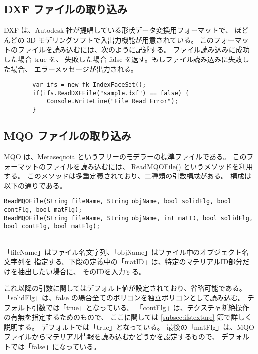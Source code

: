 \subsection{DXF ファイルの取り込み}
DXF は、Autodesk 社が提唱している形状データ変換用フォーマットで、
ほどんどの 3D モデリングソフトで入出力機能が用意されている。
このフォーマットのファイルを読み込むには、次のように記述する。
ファイル読み込みに成功した場合 true を、
失敗した場合 false を返す。もしファイル読み込みに失敗した場合、
エラーメッセージが出力される。
\\
\begin{screen}
\begin{verbatim}
        var ifs = new fk_IndexFaceSet();
        if(ifs.ReadDXFFile("sample.dxf") == false) {
            Console.WriteLine("File Read Error");
        }
\end{verbatim}
\end{screen}

\subsection{MQO ファイルの取り込み} \label{subsec:mqoread}
MQO は、Metasequoia というフリーのモデラーの標準ファイルである。
このフォーマットのファイルを読み込むには、
ReadMQOFile() というメソッドを利用する。
このメソッドは多重定義されており、二種類の引数構成がある。
構成は以下の通りである。
\\
\begin{screen}
\begin{small}
\begin{verbatim}
ReadMQOFile(String fileName, String objName, bool solidFlg, bool contFlg, bool matFlg);
ReadMQOFile(String fileName, String objName, int matID, bool solidFlg, bool contFlg, bool matFlg);
\end{verbatim}
\end{small}
\end{screen}
~ \\
「fileName」はファイル名文字列、「objName」はファイル中のオブジェクト名文字列を
指定する。下段の定義中の「matID」は、特定のマテリアルID部分だけを抽出したい場合に、
そのIDを入力する。

これ以降の引数に関してはデフォルト値が設定されており、省略可能である。
「solidFlg」は、false の場合全てのポリゴンを独立ポリゴンとして読み込む。
デフォルト引数では「true」となっている。
「contFlg」は、テクスチャ断絶操作の有無を指定するためのもので、
ここに関しては \ref{subsec:ifstexture} 節で詳しく説明する。
デフォルトでは「true」となっている。
最後の「matFlg」は、MQOファイルからマテリアル情報を読み込むかどうかを設定するもので、
デフォルトでは「false」になっている。

